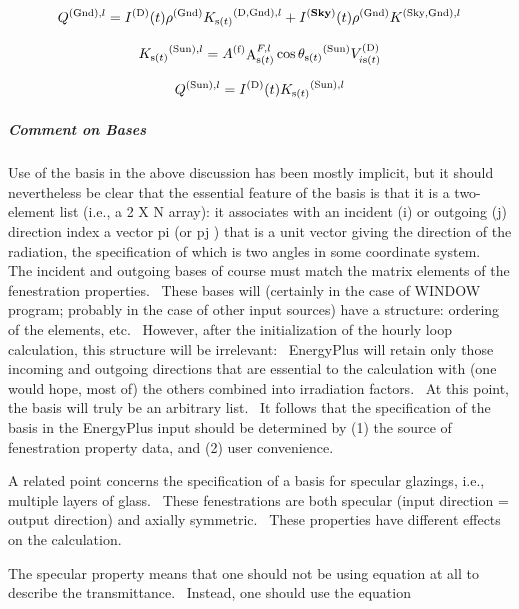 \begin{equation}
{Q^{{\rm{(Gnd)}},l}} = {I^{{\rm{(D)}}}}(t){\rho ^{{\rm{(Gnd)}}}}{K_{{\rm{s(}}t{\rm{)}}}}^{{\rm{(D, Gnd)}},l} + {I^{({\bf{Sky}})}}(t){\rho ^{{\rm{(Gnd)}}}}{K^{{\rm{(Sky, Gnd)}},l}}
\end{equation}

\begin{equation}
{K_{{\rm{s(}}t{\rm{)}}}}^{{\rm{(Sun)}},l} = {A^{{\rm{(f)}}}}{\mathop{\rm A}\nolimits}_{{\rm{s}}(t)}^{F,l}\cos {\theta_{{\rm{s(}}t{\rm{)}}}}^{{\rm{(Sun)}}}V_{i{\rm{ s(}}t{\rm{)}}}^{{\rm{(D)}}}
\end{equation}

\begin{equation}
{Q^{{\rm{(Sun)}},l}} = {I^{{\rm{(D)}}}}(t){K_{{\rm{s(}}t{\rm{)}}}}^{{\rm{(Sun)}},l}
\end{equation}

\subparagraph{Comment on Bases}\label{comment-on-bases}

Use of the basis in the above discussion has been mostly implicit, but it should nevertheless be clear that the essential feature of the basis is that it is a two-element list (i.e., a 2 X N array): it associates with an incident (i) or outgoing (j) direction index a vector pi (or pj ) that is a unit vector giving the direction of the radiation, the specification of which is two angles in some coordinate system.~ The incident and outgoing bases of course must match the matrix elements of the fenestration properties.~ These bases will (certainly in the case of WINDOW program; probably in the case of other input sources) have a structure: ordering of the elements, etc.~ However, after the initialization of the hourly loop calculation, this structure will be irrelevant:~ EnergyPlus will retain only those incoming and outgoing directions that are essential to the calculation with (one would hope, most of) the others combined into irradiation factors.~ At this point, the basis will truly be an arbitrary list.~ It follows that the specification of the basis in the EnergyPlus input should be determined by (1) the source of fenestration property data, and (2) user convenience.

A related point concerns the specification of a basis for specular glazings, i.e., multiple layers of glass.~ These fenestrations are both specular (input direction = output direction) and axially symmetric.~ These properties have different effects on the calculation.

The specular property means that one should not be using equation at all to describe the transmittance.~ Instead, one should use the equation

